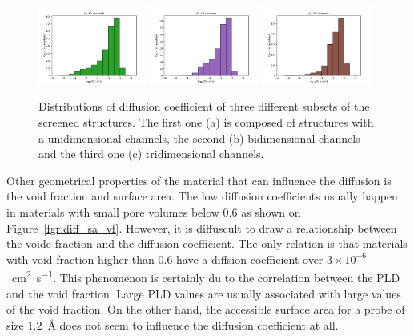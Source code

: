 \documentclass[main]{subfiles}
\begin{document}
\begin{figure}[ht]
  \centering
    \includegraphics[width=0.32\textwidth]{figures/5-diffusion/histogram_chan1D.pdf}
    \includegraphics[width=0.32\textwidth]{figures/5-diffusion/histogram_chan2D.pdf}
    \includegraphics[width=0.32\textwidth]{figures/5-diffusion/histogram_chan3D.pdf}
    \caption{ Distributions of diffusion coefficient of three different subsets of the screened structures. The first one (a) is composed of structures with a unidimensional channels, the second (b) bidimensional channels and the third one (c) tridimensional channels. }\label{fgr:hist_diffusion_chandim}
\end{figure}

Other geometrical properties of the material that can influence the diffusion is the void fraction and surface area. The low diffusion coefficients usually happen in materials with small pore volumes below $0.6$ as shown on Figure~\ref{fgr:diff_sa_vf}. However, it is diffuscult to draw a relationship between the voide fraction and the diffusion coefficient. The only relation is that materials with void fraction higher than $0.6$ have a diffsion coefficient over $3\times 10^{-6}$~\si{\square\cm\per\s}. This phenomenon is certainly du to the correlation between the PLD and the void fraction. Large PLD values are usually associated with large values of the void fraction. On the other hand, the accessible surface area for a probe of size $1.2$~\si{\angstrom} does not seem to influence the diffusion coefficient at all. 
\end{document}
